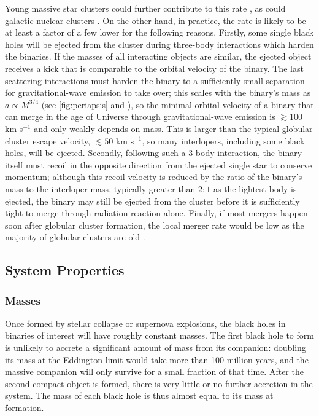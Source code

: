 \documentclass[iop,onecolumn]{revtex4}
\begin{document}
Young massive star clusters could further contribute to this rate \citep[e.g.,][]{Ziosi:2014}, as could galactic nuclear clusters \citep[e.g.,][]{MillerLauburg:2008,Bartos:2016,Stone:2016}.  On the other hand, in practice, the rate is likely to be at least a factor of a few lower for the following reasons.  Firstly, some single black holes will be ejected from the cluster during three-body interactions which harden the binaries.  If the masses of all interacting objects are similar, the ejected object receives a kick that is comparable to the orbital velocity of the binary.  The last scattering interactions must harden the binary to a sufficiently small separation for gravitational-wave emission to take over; this scales with the binary's mass as $a \propto M^{3/4}$ (see \autoref{fig:periapsis} and \citet{Peters:1964}), so the minimal orbital velocity of a binary that can merge in the age of Universe through gravitational-wave emission is $\gtrsim 100$ km s$^{-1}$ and only weakly depends on mass.   This is larger than the typical globular cluster escape velocity, $\lesssim 50$ km s$^{-1}$, so many interlopers, including some black holes, will be ejected.  Secondly, following such a 3-body interaction, the binary itself must recoil in the opposite direction from the ejected single star to conserve momentum; although this recoil velocity is reduced by the ratio of the binary's mass to the interloper mass, typically greater than $2:1$ as the lightest body is ejected, the binary may still be ejected from the cluster before it is sufficiently tight to merge through radiation reaction alone. Finally, if most mergers happen soon after globular cluster formation, the local merger rate would be low as the majority of globular clusters are old \citep{Rodriguez:2016big}.

\subsection{System Properties}
\subsubsection{Masses}
Once formed by stellar collapse or supernova explosions, the black holes in binaries of interest will have roughly constant masses. The first black hole to form is unlikely to accrete a significant amount of mass from its companion: doubling its mass at the Eddington limit would take more than 100 million years, and the massive companion will only survive for a small fraction of that time. After the second compact object is formed, there is very little or no further accretion in the system. The mass of each black hole is thus almost equal to its mass at formation. 
\end{document}
